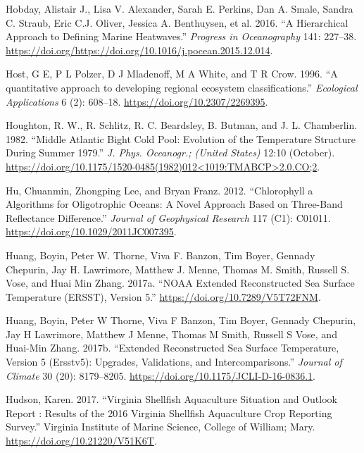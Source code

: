 \documentclass[
]{book}
\begin{document}
\leavevmode\hypertarget{ref-hobday2016}{}%
Hobday, Alistair J., Lisa V. Alexander, Sarah E. Perkins, Dan A. Smale, Sandra C. Straub, Eric C.J. Oliver, Jessica A. Benthuysen, et al. 2016. ``A Hierarchical Approach to Defining Marine Heatwaves.'' \emph{Progress in Oceanography} 141: 227--38. \url{https://doi.org/https://doi.org/10.1016/j.pocean.2015.12.014}.

\leavevmode\hypertarget{ref-Host1996}{}%
Host, G E, P L Polzer, D J Mladenoff, M A White, and T R Crow. 1996. ``A quantitative approach to developing regional ecosystem classifications.'' \emph{Ecological Applications} 6 (2): 608--18. \url{https://doi.org/10.2307/2269395}.

\leavevmode\hypertarget{ref-houghton_middle_1982}{}%
Houghton, R. W., R. Schlitz, R. C. Beardsley, B. Butman, and J. L. Chamberlin. 1982. ``Middle Atlantic Bight Cold Pool: Evolution of the Temperature Structure During Summer 1979.'' \emph{J. Phys. Oceanogr.; (United States)} 12:10 (October). \href{https://doi.org/10.1175/1520-0485(1982)012\%3C1019:TMABCP\%3E2.0.CO;2}{https://doi.org/10.1175/1520-0485(1982)012\textless{}1019:TMABCP\textgreater{}2.0.CO;2}.

\leavevmode\hypertarget{ref-SOE5}{}%
Hu, Chuanmin, Zhongping Lee, and Bryan Franz. 2012. ``Chlorophyll a Algorithms for Oligotrophic Oceans: A Novel Approach Based on Three-Band Reflectance Difference.'' \emph{Journal of Geophysical Research} 117 (C1): C01011. \url{https://doi.org/10.1029/2011JC007395}.

\leavevmode\hypertarget{ref-Huang2017}{}%
Huang, Boyin, Peter W. Thorne, Viva F. Banzon, Tim Boyer, Gennady Chepurin, Jay H. Lawrimore, Matthew J. Menne, Thomas M. Smith, Russell S. Vose, and Huai Min Zhang. 2017a. ``NOAA Extended Reconstructed Sea Surface Temperature (ERSST), Version 5.'' \url{https://doi.org/10.7289/V5T72FNM}.

\leavevmode\hypertarget{ref-huang2017extended}{}%
Huang, Boyin, Peter W Thorne, Viva F Banzon, Tim Boyer, Gennady Chepurin, Jay H Lawrimore, Matthew J Menne, Thomas M Smith, Russell S Vose, and Huai-Min Zhang. 2017b. ``Extended Reconstructed Sea Surface Temperature, Version 5 (Ersstv5): Upgrades, Validations, and Intercomparisons.'' \emph{Journal of Climate} 30 (20): 8179--8205. \url{https://doi.org/10.1175/JCLI-D-16-0836.1}.

\leavevmode\hypertarget{ref-Hudson2017a}{}%
Hudson, Karen. 2017. ``Virginia Shellfish Aquaculture Situation and Outlook Report : Results of the 2016 Virginia Shellfish Aquaculture Crop Reporting Survey.'' Virginia Institute of Marine Science, College of William; Mary. \url{https://doi.org/10.21220/V51K6T}.
\end{document}
